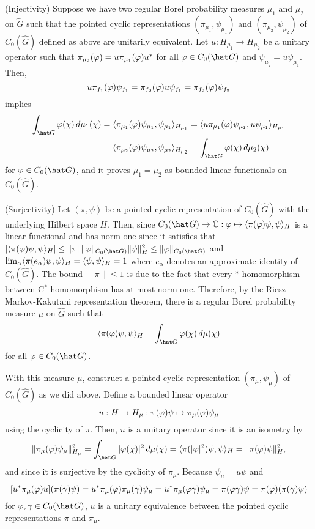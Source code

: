 \documentclass{../../small}
\begin{document}
\begin{pf}
(Injectivity)
Suppose we have two regular Borel probability measures $\mu_1$ and $\mu_2$ on $\hat G$ such that the pointed cyclic representations $(\pi_{\mu_1},\psi_{\mu_1})$ and $(\pi_{\mu_2},\psi_{\mu_2})$ of $C_0(\hat G)$ defined as above are unitarily equivalent.
Let $u:H_{\mu_1}\to H_{\mu_2}$ be a unitary operator such that $\pi_{\mu_2}(\varphi)=u\pi_{\mu_1}(\varphi)u^*$ for all $\f\in C_0(\hat G)$ and $\psi_{\mu_2}=u\psi_{\mu_1}$.
Then,
\[u\pi_{f_1}(\varphi)\psi_{f_1}=\pi_{f_2}(\varphi)u\psi_{f_1}=\pi_{f_2}(\varphi)\psi_{f_2}\]
implies
\begin{align*}
\int_{\hat G}\f(\chi)\,d\mu_1(\chi)&=\<\pi_{\mu_1}(\f)\psi_{\mu_1},\psi_{\mu_1}\>_{H_{\mu_1}}=\<u\pi_{\mu_1}(\f)\psi_{\mu_1},u\psi_{\mu_1}\>_{H_{\mu_1}}\\
&=\<\pi_{\mu_2}(\f)\psi_{\mu_2},\psi_{\mu_2}\>_{H_{\mu_2}}=\int_{\hat G}\f(\chi)\,d\mu_2(\chi)
\end{align*}
for $\f\in C_0(\hat G)$, and it proves $\mu_1=\mu_2$ as bounded linear functionals on $C_0(\hat G)$.

(Surjectivity)
Let $(\pi,\psi)$ be a pointed cyclic representation of $C_0(\hat G)$ with the underlying Hilbert space $H$.
Then, since $C_0(\hat G)\to\C:\f\mapsto\<\pi(\f)\psi,\psi\>_H$ is a linear functional and has norm one since it satisfies that $|\<\pi(\f)\psi,\psi\>_H|\le\|\pi\|\|\f\|_{C_0(\hat G)}\|\psi\|_H^2\le\|\f\|_{C_0(\hat G)}$ and $\lim_\alpha\langle\pi(e_\alpha)\psi,\psi\rangle_H=\langle\psi,\psi\rangle_H=1$ where $e_\alpha$ denotes an approximate identity of $C_0(\hat G)$.
The bound $\|\pi\|\le1$ is due to the fact that every $*$-homomorphism between C$^*$-homomorphism has at most norm one.
Therefore, by the Riesz-Markov-Kakutani representation theorem, there is a regular Borel probability measure $\mu$ on $\hat G$ such that
\[\<\pi(\f)\psi,\psi\>_H=\int_{\hat G}\f(\chi)\,d\mu(\chi)\]
for all $\f\in C_0(\hat G)$.

With this measure $\mu$, construct a pointed cyclic representation $(\pi_\mu,\psi_\mu)$ of $C_0(\hat G)$ as we did above.
Define a bounded linear operator
\[u:H\to H_\mu:\pi(\varphi)\psi\mapsto\pi_\mu(\varphi)\psi_\mu\]
using the cyclicity of $\pi$.
Then, $u$ is a unitary operator since it is an isometry by
\[\|\pi_\mu(\f)\psi_\mu\|_{H_\mu}^2=\int_{\hat G}|\f(\chi)|^2\,d\mu(\chi)=\<\pi(|\f|^2)\psi,\psi\>_H=\|\pi(\f)\psi\|_H^2,\]
and since it is surjective by the cyclicity of $\pi_\mu$.
Because $\psi_\mu=u\psi$ and
\[[u^*\pi_\mu(\varphi)u](\pi(\gamma)\psi)=u^*\pi_\mu(\varphi)\pi_\mu(\gamma)\psi_\mu=u^*\pi_\mu(\varphi\gamma)\psi_\mu=\pi(\varphi\gamma)\psi=\pi(\varphi)(\pi(\gamma)\psi)\]
for $\f,\gamma\in C_0(\hat G)$, $u$ is a unitary equivalence between the pointed cyclic representations $\pi$ and $\pi_\mu$.
\end{pf}
\end{document}
